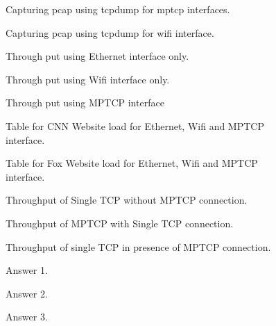 \documentclass[a4paper,11pt]{article}
\theoremstyle{quest}
\begin{document}
\begin{figure}[h]
	\centering
	\caption{Capturing pcap using tcpdump for mptcp interfaces.}
\end{figure}

\begin{figure}[h]
	\centering
	\caption{Capturing pcap using tcpdump for wifi interface.}
\end{figure}

\begin{figure}[h]
	\centering
	\caption{Through put using Ethernet interface only.}
\end{figure}

\begin{figure}[h]
	\centering
	\caption{Through put using Wifi interface only.}
\end{figure}
\begin{figure}[h]
	\centering
	\caption{Through put using MPTCP interface}
\end{figure}
\begin{figure}[h]
	\centering
	\caption{Table for CNN Website load for Ethernet, Wifi and MPTCP interface.}
\end{figure}
\begin{figure}[h]
	\centering
	\caption{Table for Fox Website load for Ethernet, Wifi and MPTCP interface.}
\end{figure}
\begin{figure}[h]
	\centering
	\caption{Throughput of Single TCP without MPTCP connection.}
\end{figure}
\begin{figure}[h]
	\centering
	\caption{Throughput of MPTCP with Single TCP connection.}
\end{figure}
\begin{figure}[h]
	\centering
	\caption{Throughput of single TCP in presence of MPTCP connection.}
\end{figure}

\begin{figure}[h]
	\centering
	\caption{Answer 1.}
\end{figure}
\begin{figure}[h]
	\centering
	\caption{Answer 2.}
\end{figure}
\begin{figure}[h]
	\centering
	\caption{Answer 3.}
\end{figure}
\end{document}
